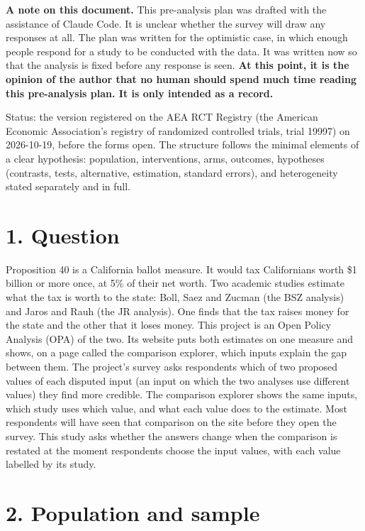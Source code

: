 \textbf{A note on this document.} This pre-analysis plan was drafted with the assistance of Claude
Code. It is unclear whether the survey will draw any responses at all. The plan was written for
the optimistic case, in which enough people respond for a study to be conducted with the data. It
was written now so that the analysis is fixed before any response is seen. \textbf{At this point, it is the opinion of the
author that no human should spend much time reading this pre-analysis plan. It is only intended
as a record.}

Status: the version registered on the AEA RCT Registry (the American Economic Association's
registry of randomized controlled trials, trial 19997) on 2026-10-19, before the forms open. The structure follows the minimal elements of a clear hypothesis: population,
interventions, arms, outcomes, hypotheses (contrasts, tests, alternative, estimation, standard
errors), and heterogeneity stated separately and in full.

\section{1. Question}\label{question}

Proposition 40 is a California ballot measure. It would tax Californians worth \$1 billion or more
once, at 5\% of their net worth. Two academic studies estimate what the tax is worth to the state:
Boll, Saez and Zucman (the BSZ analysis) and Jaros and Rauh (the JR analysis). One finds that the
tax raises money for the state and the other that it loses money. This project is an Open Policy
Analysis (OPA) of the two. Its website puts both estimates on one measure and shows, on a page
called the comparison explorer, which inputs explain the gap between them. The project's survey
asks respondents which of two proposed values of each disputed input (an input on which the two
analyses use different values) they find more credible. The comparison explorer shows the same
inputs, which study uses which value, and what each value does to the estimate. Most respondents
will have seen that comparison on the site before they open the survey. This study asks whether
the answers change when the comparison is restated at the moment respondents choose the input
values, with each value labelled by its study.

\section{2. Population and sample}\label{population-and-sample}

